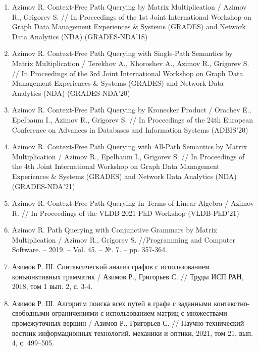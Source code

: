 \begin{enumerate}
    \item Azimov R. Context-Free Path Querying by
	Matrix Multiplication / Azimov R., Grigorev S. // In Proceedings of the
	1st Joint International Workshop on Graph Data Management Experiences \&
	Systems (GRADES) and Network Data Analytics (NDA) (GRADES-NDA’18)
	\item Azimov R. Context-Free Path Querying with Single-Path Semantics by
	Matrix Multiplication / Terekhov A., Khoroshev A., Azimov R., Grigorev S. // In Proceedings of the
	3rd Joint International Workshop on Graph Data Management Experiences \&
	Systems (GRADES) and Network Data Analytics (NDA) (GRADES-NDA’20)
	\item Azimov R. Context-Free Path Querying by Kronecker
	Product / Orachev E., Epelbaum I., Azimov R., Grigorev S. // In Proceedings of the
	24th European Conference on Advances in Databases and Information Systems (ADBIS’20)
	\item Azimov R. Context-Free Path Querying with All-Path Semantics by
	Matrix Multiplication / Azimov R., Epelbaum I., Grigorev S. // In Proceedings of the
	4th Joint International Workshop on Graph Data Management Experiences \&
	Systems (GRADES) and Network Data Analytics (NDA) (GRADES-NDA’21)
	
	\item Azimov R. Context-Free Path Querying In Terms of Linear Algebra / Azimov R. // In Proceedings of the VLDB 2021 PhD Workshop (VLDB-PhD'21)
	
	\item Azimov R. Path Querying with Conjunctive Grammars by Matrix Multiplication / Azimov R., Grigorev S. //Programming and Computer Software. – 2019. – Vol. 45. – №. 7. – pp. 357-364.
	\setcounter{firstbib}{\value{enumiv}}
	
	\item Азимов Р. Ш. Синтаксический анализ графов с использованием конъюнктивных грамматик / Азимов Р., Григорьев С. // Труды ИСП РАН, 2018, том 1 вып. 2, с. 3-4.
	\item Азимов Р. Ш. Алгоритм поиска всех путей в графе с заданными контекстно-свободными ограничениями с использованием матриц с множествами промежуточных вершин / Азимов Р., Григорьев С. // Научно-технический вестник информационных технологий, механики и оптики, 2021, том 21, вып. 4, с. 499–505.
\end{enumerate}


